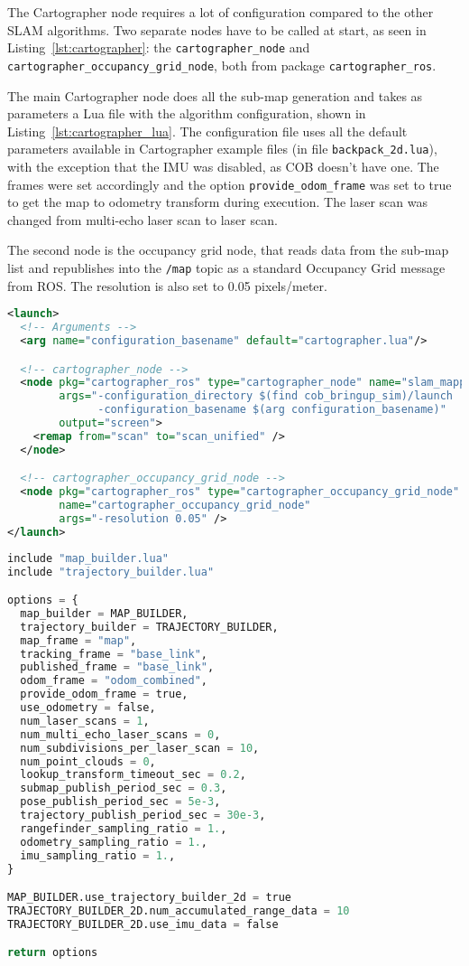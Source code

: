 The Cartographer node requires a lot of configuration compared to the other SLAM algorithms. Two separate nodes have to be called at start, as seen in Listing~\ref{lst:cartographer}: the \texttt{cartographer\_node} and \texttt{cartographer\_occupancy\_grid\_node}, both from package \texttt{cartographer\_ros}.

The main Cartographer node does all the sub-map generation and takes as parameters a Lua file with the algorithm configuration, shown in Listing~\ref{lst:cartographer_lua}. The configuration file uses all the default parameters available in Cartographer example files (in file \texttt{backpack\_2d.lua}), with the exception that the IMU was disabled, as COB doesn't have one. The frames were set accordingly and the option \texttt{provide\_odom\_frame} was set to true to get the map to odometry transform during execution. The laser scan was changed from multi-echo laser scan to laser scan.

The second node is the occupancy grid node, that reads data from the sub-map list and republishes into the \texttt{/map} topic as a standard Occupancy Grid message from ROS. The resolution is also set to 0.05 pixels/meter.

\begin{lstlisting}[caption={Cartographer launch file.},label={lst:cartographer},language=XML]
<launch>
  <!-- Arguments -->
  <arg name="configuration_basename" default="cartographer.lua"/>

  <!-- cartographer_node -->
  <node pkg="cartographer_ros" type="cartographer_node" name="slam_mapping"
        args="-configuration_directory $(find cob_bringup_sim)/launch
              -configuration_basename $(arg configuration_basename)"
        output="screen">
    <remap from="scan" to="scan_unified" />
  </node>

  <!-- cartographer_occupancy_grid_node -->
  <node pkg="cartographer_ros" type="cartographer_occupancy_grid_node"
        name="cartographer_occupancy_grid_node"
        args="-resolution 0.05" />
</launch>
\end{lstlisting}

\begin{lstlisting}[caption={Cartographer Lua configuration.},label={lst:cartographer_lua},language=Python]
include "map_builder.lua"
include "trajectory_builder.lua"

options = {
  map_builder = MAP_BUILDER,
  trajectory_builder = TRAJECTORY_BUILDER,
  map_frame = "map",
  tracking_frame = "base_link",
  published_frame = "base_link",
  odom_frame = "odom_combined",
  provide_odom_frame = true,
  use_odometry = false,
  num_laser_scans = 1,
  num_multi_echo_laser_scans = 0,
  num_subdivisions_per_laser_scan = 10,
  num_point_clouds = 0,
  lookup_transform_timeout_sec = 0.2,
  submap_publish_period_sec = 0.3,
  pose_publish_period_sec = 5e-3,
  trajectory_publish_period_sec = 30e-3,
  rangefinder_sampling_ratio = 1.,
  odometry_sampling_ratio = 1.,
  imu_sampling_ratio = 1.,
}

MAP_BUILDER.use_trajectory_builder_2d = true
TRAJECTORY_BUILDER_2D.num_accumulated_range_data = 10
TRAJECTORY_BUILDER_2D.use_imu_data = false

return options
\end{lstlisting}

